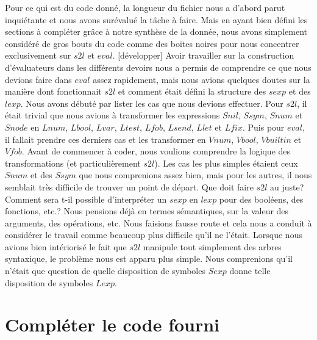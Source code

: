 \documentclass{article}
\begin{document}
	Pour ce qui est du code donné, la longueur du fichier nous a d'abord parut inquiétante
	et nous avons surévalué la tâche à faire. Mais en ayant bien défini les
	sections à compléter grâce à notre synthèse de la donnée, nous avons simplement
	considéré de gros bouts du code comme des boites noires pour nous concentrer exclusivement
	sur $s2l$ et $eval$. [développer] Avoir travailler sur la construction d'évaluateurs
	dans les différents devoirs nous a permis de comprendre ce que nous devions
	faire dans $eval$ assez rapidement, mais nous avions quelques doutes sur la manière
	dont fonctionnait $s2l$ et comment était défini la structure des $sexp$ et des
	$lexp$. Nous avons débuté par lister les cas que nous devions effectuer. Pour $s
	2l$, il était trivial que nous avions à transformer les expressions $Snil$, $Ss
	ym$, $Snum$ et $Snode$ en $Lnum$, $Lbool$, $Lvar$, $Ltest$, $Lfob$, $Lsend$,
	$Llet$ et $Lfix$. Puis pour $eval$, il fallait prendre ces derniers cas et les
	transformer en $Vnum$, $Vbool$, $Vbuiltin$ et $Vfob$. Avant de commencer à coder,
	nous voulions comprendre la logique des transformations (et particulièrement $s
	2l$). Les cas les plus simples étaient ceux $Snum$ et des $Ssym$ que nous comprenions
	assez bien, mais pour les autres, il nous semblait très difficile de trouver un
	point de départ. Que doit faire $s2l$ au juste? Comment sera t-il possible d'interpréter
	un $sexp$ en $lexp$ pour des booléens, des fonctions, etc.? Nous pensions déjà
	en termes sémantiques, sur la valeur des arguments, des opérations, etc. Nous faisions
	fausse route et cela nous a conduit à considérer le travail comme beaucoup plus
	difficile qu'il ne l'était. Lorsque nous avions bien intériorisé le fait que
	$s2l$ manipule tout simplement des arbres syntaxique, le problème nous est apparu
	plus simple. Nous comprenions qu'il n'était que question de quelle disposition
	de symboles $Sexp$ donne telle disposition de symboles $Lexp$.

	\section{Compléter le code fourni}
\end{document}
